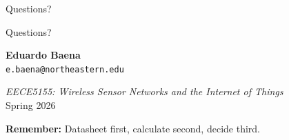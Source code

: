 \documentclass[aspectratio=169,11pt]{beamer}
\begin{document}
\begin{frame}{Questions?}
    \begin{center}
        \Huge Questions?
        
        \vspace{1cm}
        \normalsize
        \textbf{Eduardo Baena}\\
        \texttt{e.baena@northeastern.edu}
        
        \vspace{0.5cm}
        \textit{EECE5155: Wireless Sensor Networks and the Internet of Things}\\
        Spring 2026
        
        \vspace{0.5cm}
        \textbf{Remember:} Datasheet first, calculate second, decide third.
    \end{center}
\end{frame}
\end{document}
